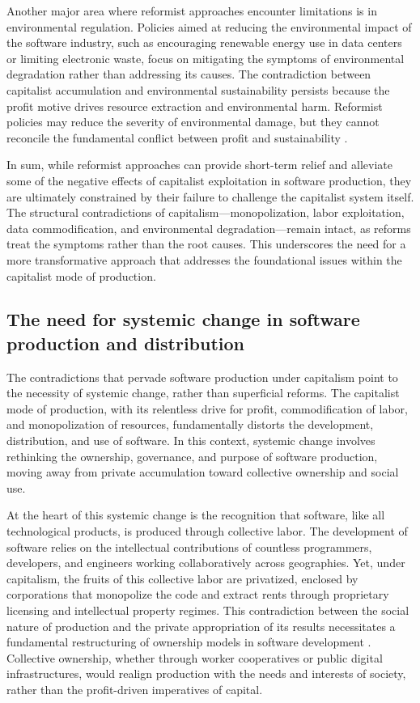 \begin{refsection}
Another major area where reformist approaches encounter limitations is in environmental regulation. Policies aimed at reducing the environmental impact of the software industry, such as encouraging renewable energy use in data centers or limiting electronic waste, focus on mitigating the symptoms of environmental degradation rather than addressing its causes. The contradiction between capitalist accumulation and environmental sustainability persists because the profit motive drives resource extraction and environmental harm. Reformist policies may reduce the severity of environmental damage, but they cannot reconcile the fundamental conflict between profit and sustainability \cite[pp.~203-205]{maxwell2012}.

In sum, while reformist approaches can provide short-term relief and alleviate some of the negative effects of capitalist exploitation in software production, they are ultimately constrained by their failure to challenge the capitalist system itself. The structural contradictions of capitalism—monopolization, labor exploitation, data commodification, and environmental degradation—remain intact, as reforms treat the symptoms rather than the root causes. This underscores the need for a more transformative approach that addresses the foundational issues within the capitalist mode of production.

\subsection{The need for systemic change in software production and distribution}

The contradictions that pervade software production under capitalism point to the necessity of systemic change, rather than superficial reforms. The capitalist mode of production, with its relentless drive for profit, commodification of labor, and monopolization of resources, fundamentally distorts the development, distribution, and use of software. In this context, systemic change involves rethinking the ownership, governance, and purpose of software production, moving away from private accumulation toward collective ownership and social use.

At the heart of this systemic change is the recognition that software, like all technological products, is produced through collective labor. The development of software relies on the intellectual contributions of countless programmers, developers, and engineers working collaboratively across geographies. Yet, under capitalism, the fruits of this collective labor are privatized, enclosed by corporations that monopolize the code and extract rents through proprietary licensing and intellectual property regimes. This contradiction between the social nature of production and the private appropriation of its results necessitates a fundamental restructuring of ownership models in software development \cite[pp.~45-47]{fuchs2015}. Collective ownership, whether through worker cooperatives or public digital infrastructures, would realign production with the needs and interests of society, rather than the profit-driven imperatives of capital.


\end{refsection}
